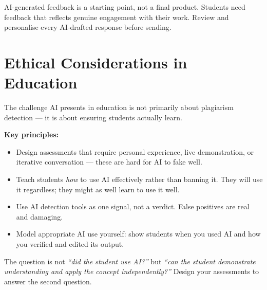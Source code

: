 \begin{warnbox}
AI-generated feedback is a starting point, not a final product.
Students need feedback that reflects genuine engagement with their work.
Review and personalise every AI-drafted response before sending.
\end{warnbox}

\section{Ethical Considerations in Education}
\label{sec:edu-ethics}

The challenge AI presents in education is not primarily about plagiarism detection ---
it is about ensuring students actually learn.

\textbf{Key principles:}
\begin{itemize}
  \item Design assessments that require personal experience, live demonstration, or
        iterative conversation --- these are hard for AI to fake well.
  \item Teach students \emph{how} to use AI effectively rather than banning it.
        They will use it regardless; they might as well learn to use it well.
  \item Use AI detection tools as one signal, not a verdict.
        False positives are real and damaging.
  \item Model appropriate AI use yourself: show students when you used AI and how
        you verified and edited its output.
\end{itemize}

\begin{infobox}
The question is not \textit{``did the student use AI?''} but \textit{``can the student
demonstrate understanding and apply the concept independently?''}
Design your assessments to answer the second question.
\end{infobox}

